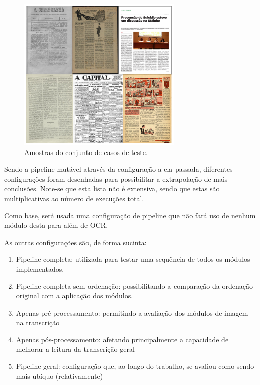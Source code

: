 \begin{figure}[H]
	\centering
	\includegraphics[width=0.7\textwidth]{images/ilustracoes/casos_teste.png}
	\caption{Amostras do conjunto de casos de teste.}
	\label{fig:casos_teste}
\end{figure}


Sendo a pipeline mutável através da configuração a ela passada, diferentes configurações foram desenhadas para possibilitar a extrapolação de mais conclusões. Note-se que esta lista não é extensiva, sendo que estas são multiplicativas ao número de execuções total.

Como base, será usada uma configuração de pipeline que não fará uso de nenhum módulo desta para além de OCR.

As outras configurações são, de forma sucinta:

\begin{enumerate}\setlength\itemsep{-0.9em}
	\item Pipeline completa: utilizada para testar uma sequência de todos os módulos implementados.
	\item Pipeline completa sem ordenação: possibilitando a comparação da ordenação original com a aplicação dos módulos.
	\item Apenas pré-processamento: permitindo a avaliação dos módulos de imagem na transcrição
	\item Apenas pós-processamento: afetando principalmente a capacidade de melhorar a leitura da transcrição geral
	\item Pipeline geral: configuração que, ao longo do trabalho, se avaliou como sendo mais ubíquo (relativamente)
\end{enumerate}


